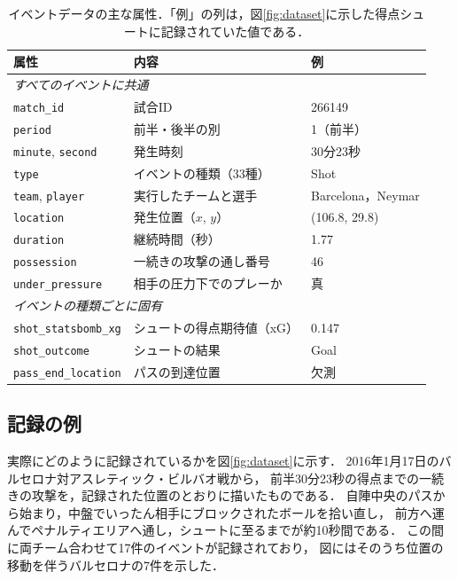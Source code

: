 \documentclass[11pt]{ujarticle} %
\begin{document}
\begin{table}[htbp]
    \centering
    \caption{イベントデータの主な属性．「例」の列は，図\ref{fig:dataset}に示した得点シュートに記録されていた値である．}
    \label{tab:attributes}
    \small
    \begin{tabular}{|l|p{6.2cm}|l|}
    \hline
    属性 & 内容 & 例 \\
    \hline
    \multicolumn{3}{|l|}{\textit{すべてのイベントに共通}} \\
    \hline
    \texttt{match\_id} & 試合ID & 266149 \\
    \hline
    \texttt{period} & 前半・後半の別 & 1（前半） \\
    \hline
    \texttt{minute}, \texttt{second} & 発生時刻 & 30分23秒 \\
    \hline
    \texttt{type} & イベントの種類（33種） & Shot \\
    \hline
    \texttt{team}, \texttt{player} & 実行したチームと選手 & Barcelona，Neymar \\
    \hline
    \texttt{location} & 発生位置（$x$, $y$） & (106.8, 29.8) \\
    \hline
    \texttt{duration} & 継続時間（秒） & 1.77 \\
    \hline
    \texttt{possession} & 一続きの攻撃の通し番号 & 46 \\
    \hline
    \texttt{under\_pressure} & 相手の圧力下でのプレーか & 真 \\
    \hline
    \multicolumn{3}{|l|}{\textit{イベントの種類ごとに固有}} \\
    \hline
    \texttt{shot\_statsbomb\_xg} & シュートの得点期待値（xG） & 0.147 \\
    \hline
    \texttt{shot\_outcome} & シュートの結果 & Goal \\
    \hline
    \texttt{pass\_end\_location} & パスの到達位置 & 欠測 \\
    \hline
    \end{tabular}
\end{table}

\subsection{記録の例}

実際にどのように記録されているかを図\ref{fig:dataset}に示す．
2016年1月17日のバルセロナ対アスレティック・ビルバオ戦から，
前半30分23秒の得点までの一続きの攻撃を，記録された位置のとおりに描いたものである．
自陣中央のパスから始まり，中盤でいったん相手にブロックされたボールを拾い直し，
前方へ運んでペナルティエリアへ通し，シュートに至るまでが約10秒間である．
この間に両チーム合わせて17件のイベントが記録されており，
図にはそのうち位置の移動を伴うバルセロナの7件を示した．
\end{document}
